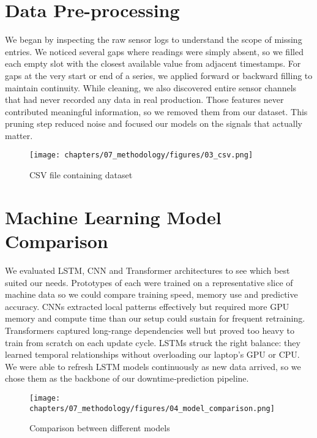 \section{Data Pre-processing}
We began by inspecting the raw sensor logs to understand the scope of missing entries. We noticed several gaps where readings were simply absent, so we filled each empty slot with the closest available value from adjacent timestamps. For gaps at the very start or end of a series, we applied forward or backward filling to maintain continuity. While cleaning, we also discovered entire sensor channels that had never recorded any data in real production. Those features never contributed meaningful information, so we removed them from our dataset. This pruning step reduced noise and focused our models on the signals that actually matter.

\begin{figure}[H]
    \centering
    \texttt{[image: chapters/07\_methodology/figures/03\_csv.png]}
    \caption{CSV file containing dataset}
\end{figure}

\section{Machine Learning Model Comparison}
We evaluated LSTM, CNN and Transformer architectures to see which best suited our needs. Prototypes of each were trained on a representative slice of machine data so we could compare training speed, memory use and predictive accuracy. CNNs extracted local patterns effectively but required more GPU memory and compute time than our setup could sustain for frequent retraining. Transformers captured long-range dependencies well but proved too heavy to train from scratch on each update cycle. LSTMs struck the right balance: they learned temporal relationships without overloading our laptop’s GPU or CPU. We were able to refresh LSTM models continuously as new data arrived, so we chose them as the backbone of our downtime‐prediction pipeline.

\begin{figure}[H]
    \centering
    \texttt{[image: chapters/07\_methodology/figures/04\_model\_comparison.png]}
    \caption{Comparison between different models}
\end{figure}

